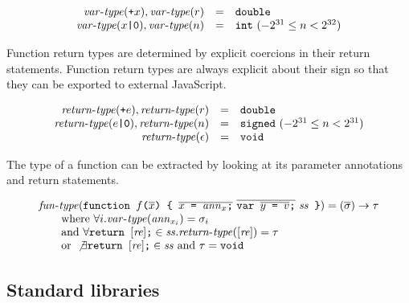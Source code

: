 \documentclass{article}
\newcommand{\funtype}{\mathit{fun}\mbox{-}\mathit{type}}
\newcommand{\vartype}{\mathit{var}\mbox{-}\mathit{type}}
\newcommand{\rettype}{\mathit{return}\mbox{-}\mathit{type}}
\newcommand{\funty}[2]{({#1}) \rightarrow {#2}}
\newcommand{\seq}[1]{\overline{{#1}}}
\newcommand{\mathjs}[1]{\mbox{\texttt{{#1}}}}
\newcommand{\return}[1]{\mathjs{return }{#1}\mathjs{;}}
\newcommand{\fun}[3]{\mathjs{function }{#1}\mathjs{(}{#2}\mathjs{) \char123{} }{#3}\mathjs{ \char125{}}}
\newcommand{\var}[1]{\mathjs{var }{#1}\mathjs{;}}
\newcommand{\signed}{\mathtt{signed}}
\newcommand{\double}{\mathtt{double}}
\newcommand{\void}{\mathtt{void}}
\newcommand{\todouble}[1]{\mathjs{+}{#1}}
\renewcommand{\int}{\mathtt{int}}
\begin{document}
\[
\begin{array}{rcl}
\vartype(\todouble{x}), \vartype(r) & = & \double \\
\vartype(x\mathjs{|0}), \vartype(n) & = & \int \mbox{ $(-2^{31} \leq n < 2^{32})$}
\end{array}
\]

Function return types are determined by explicit coercions in their
return statements. Function return types are always explicit about
their sign so that they can be exported to external JavaScript.

\[
\begin{array}{rcl}
\rettype(\todouble{e}), \rettype(r) & = & \double \\
\rettype(e\mathjs{|0}), \rettype(n) & = & \signed \mbox{ $(-2^{31} \leq n < 2^{31})$} \\
\rettype(\epsilon)                  & = & \void \\
\end{array}
\]

The type of a function can be extracted by looking at its parameter
annotations and return statements.

\[
\begin{array}{l}
\funtype(\fun{f}{\seq{x}}{\seq{x\mathjs{ = }\mathit{ann}_x\mathjs{;}}\ \seq{\var{\seq{y\mathjs{ = }v}}}\ \mathit{ss}}) = \funty{\seq{\sigma}}{\tau} \\
\qquad \mbox{where } \forall i . \vartype(\mathit{ann}_{x_i}) = \sigma_i \\
\qquad \mbox{and } \forall \return{[\mathit{re}]} \in \mathit{ss} . \rettype([\mathit{re}]) = \tau \\
\qquad \mbox{or } \not\exists \return{[\mathit{re}]} \in \mathit{ss} \mbox{ and } \tau = \void \\
\end{array}
\]

\subsection{Standard libraries}
\end{document}
